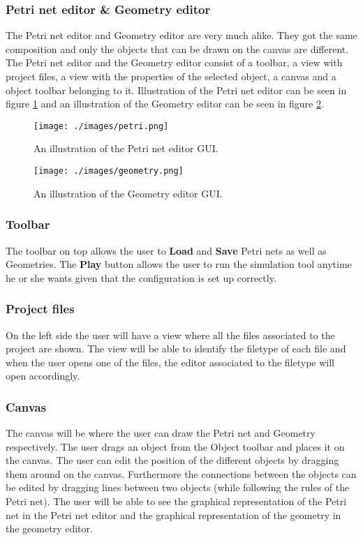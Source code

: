 \documentclass[fontsize=12pt, paper=a4]{article}
\begin{document}
\subsubsection{Petri net editor \& Geometry editor}
The Petri net editor and Geometry editor are very much alike. They got the same composition and only the objects that can be drawn on the canvas are different. The Petri net editor and the Geometry editor consist of a toolbar, a view with project files, a view with the properties of the selected object, a canvas and a object toolbar belonging to it. Illustration of the Petri net editor can be seen in figure \ref{fig:petrinet_editor} and an illustration of the Geometry editor can be seen in figure \ref{fig:geometry_editor}. 

\begin{figure}[H]
\begin{center}
\texttt{[image: ./images/petri.png]}
\caption{An illustration of the Petri net editor GUI.}
\label{fig:petrinet_editor}
\end{center}
\end{figure}

\begin{figure}[H]
\begin{center}
\texttt{[image: ./images/geometry.png]}
\caption{An illustration of the Geometry editor GUI.}
\label{fig:geometry_editor}
\end{center}
\end{figure}

\subsubsection{Toolbar}
The toolbar on top allows the user to \textbf{Load} and \textbf{Save} Petri nets as well as Geometries. The \textbf{Play} button allows the user to run the simulation tool anytime he or she wants given that the configuration is set up correctly. 

\subsubsection{Project files}
On the left side the user will have a view where all the files associated to the project are shown. The view will be able to identify the filetype of each file and when the user opens one of the files, the editor associated to the filetype will open accordingly. 

\subsubsection{Canvas}
The canvas will be where the user can draw the Petri net and Geometry respectively. The user drags an object from the Object toolbar and places it on the canvas. The user can edit the position of the different objects by dragging them around on the canvas. Furthermore the connections between the objects can be edited by dragging lines between two objects (while following the rules of the Petri net). The user will be able to see the graphical representation of the Petri net in the Petri net editor and the graphical representation of the geometry in the geometry editor. 
\end{document}
